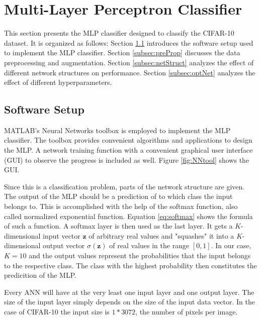 \section{Multi-Layer Perceptron Classifier}\label{sec:MLP}
	    \pagestyle{mario}

This section presents the MLP classifier designed to classify the CIFAR-10 dataset. It is organized as follows: Section \ref{subsec:setup} introduces the software setup used to implement the MLP classifier. Section \ref{subsec:preProp} discusses the data preprocessing and augmentation. Section \ref{subsec:netStruct} analyzes the effect of different network structures on performance. Section \ref{subsec:optNet} analyzes the effect of different hyperparameters.

\subsection{Software Setup}\label{subsec:setup}

MATLAB's Neural Networks toolbox is employed to implement the MLP classifier. The toolbox provides convenient algorithms and applications to design the MLP. A network training function with a convenient graphical user interface (GUI) to observe the progress is included as well. Figure \ref{fig:NNtool} shows the GUI.

Since this is a classification problem, parts of the network structure are given. The output of the MLP should be a prediction of to which class the input belongs to. This is accomplished with the help of the softmax function, also called normalized exponential function. Equation \ref{eq:softmax} shows the formula of such a function. A softmax layer is then used as the last layer. It gets a $K$-dimensional input vector $\boldsymbol{z}$ of arbitrary real values and "squashes" it into a $K$-dimensional output vector $\sigma(\boldsymbol{z})$ of real values in the range $[0,1]$. In our case, $K=10$ and the output values represent the probabilities that the input belongs to the respective class. The class with the highest probability then constitutes the predicition of the MLP.

Every ANN will have at the very least one input layer and one output layer. The size of the input layer simply depends on the size of the input data vector. In the case of CIFAR-10 the input size is $1*3072$, the number of pixels per image.

